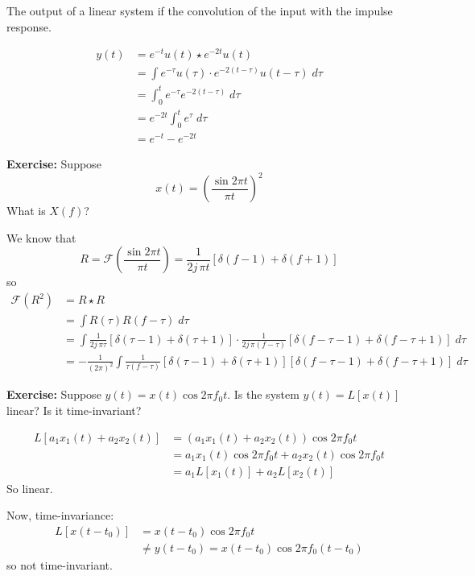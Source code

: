 \documentclass[12pt]{report}
\newcommand{\F}{\mathcal{F}}
\newenvironment*{exercise}[1][red]{
    \begin{tcolorbox}[
        parbox=false,
        colback=#1!5!white,
        colframe=#1!75!black,
        breakable
    ]}
    {\end{tcolorbox}}
\begin{document}
The output of a linear system if the convolution of the input with the impulse response. 

\begin{align*}
    y(t) &= e^{-t}u(t) \star e^{-2t}u(t)\\ 
    &= \int e^{-\tau}u(\tau) \cdot e^{-2(t- \tau)} u(t - \tau)\; d\tau \\ 
    &= \int_0^t e^{-\tau} e^{-2(t - \tau)}\; d\tau \\ 
    &= e^{-2t} \int_0^t e^{\tau}\; d\tau \\
    &= e^{-t} - e^{-2t} 
\end{align*}

\begin{exercise}
    \textbf{Exercise:} Suppose
    \[x(t) = \left(\frac{\sin 2\pi t}{\pi t}\right)^2 \]
    What is $X(f)$?
\end{exercise}

We know that 
\[R = \F\left(\frac{\sin 2\pi t}{\pi t}\right) = \frac{1}{2j\, \pi t} [\delta (f - 1) + \delta(f + 1)]\]
so 
\begin{align*}
    \F(R^2) &= R\star R\\ 
    &= \int R(\tau) R(f - \tau)\; d\tau\\
    &= \int \frac{1}{2j\, \pi \tau} [\delta(\tau - 1) + \delta(\tau + 1)] \cdot \frac{1}{2j\, \pi (f - \tau)} [\delta(f - \tau - 1) + \delta(f - \tau + 1)]\; d\tau\\
    &= -\frac{1}{(2\pi)^2} \int \frac{1}{\tau (f - \tau)} [\delta(\tau - 1) + \delta(\tau + 1)] [\delta(f - \tau - 1) + \delta(f - \tau + 1)]\; d\tau
\end{align*}


\begin{exercise}
    \textbf{Exercise:} Suppose $y(t) = x(t) \cos 2\pi f_0 t$. Is the system $y(t) = L[x(t)]$ linear? Is it time-invariant? 
\end{exercise}

\begin{align*}
    L[a_1 x_1(t) + a_2 x_2(t)] &= (a_1 x_1(t) + a_2 x_2(t)) \cos 2\pi f_0 t\\ 
    &= a_1 x_1(t) \cos 2\pi f_0 t + a_2 x_2(t) \cos 2\pi f_0 t\\
    &= a_1 L[x_1(t)] + a_2 L[x_2(t)]
\end{align*}
So linear. 

Now, time-invariance:
\begin{align*}
    L[x(t - t_0)] &= x(t - t_0) \cos 2\pi f_0 t\\ 
    &\neq y(t - t_0) = x(t - t_0) \cos 2\pi f_0 (t - t_0)
\end{align*}
so not time-invariant.
\end{document}
